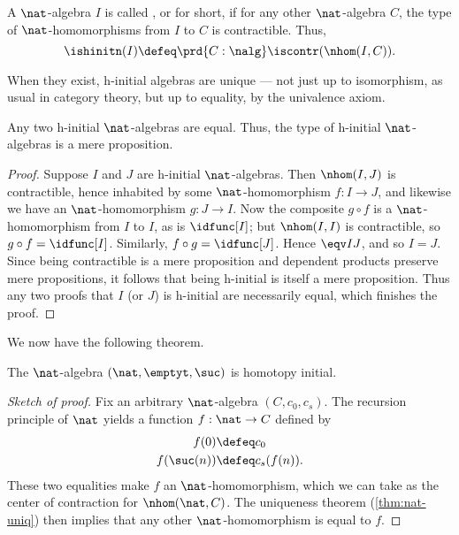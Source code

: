 \begin{defn}
  A $\nat$-algebra $I$ is called ,
  or 
  for short, if for any other $\nat$-algebra $C$, the type of $\nat$-homomorphisms from $I$ to $C$ is contractible. Thus,
\begin{equation*}
\ishinitn(I) \defeq \prd{C : \nalg} \iscontr(\nhom(I,C)).
\end{equation*}
\end{defn}

When they exist, h-initial algebras are unique --- not just up to isomorphism, as usual in category theory, but up to equality, by the univalence axiom.

\begin{thm}
  Any two h-initial $\nat$-algebras are equal.
  Thus, the type of h-initial $\nat$-algebras is a mere proposition.
\end{thm}
\begin{proof}
  Suppose $I$ and $J$ are h-initial $\nat$-algebras.
  Then $\nhom(I,J)$ is contractible, hence inhabited by some $\nat$-homomorphism $f:I\to J$, and likewise we have an $\nat$-homomorphism $g:J\to I$.
  Now the composite $g\circ f$ is a $\nat$-homomorphism from $I$ to $I$, as is $\idfunc[I]$; but $\nhom(I,I)$ is contractible, so $g\circ f = \idfunc[I]$.
  Similarly, $f\circ g = \idfunc[J]$.
  Hence $\eqv IJ$, and so $I=J$. Since being contractible is a mere proposition and dependent products preserve mere propositions, it follows that being h-initial is itself a mere proposition. Thus any two proofs that $I$ (or $J$) is h-initial are necessarily equal, which finishes the proof.
\end{proof}

We now have the following theorem.

\begin{thm}\label{thm:nat-hinitial}
The $\nat$-algebra $(\nat, \emptyt, \suc)$ is homotopy initial.
\end{thm}
\begin{proof}[Sketch of proof]
  Fix an arbitrary $\nat$-algebra $(C,c_0,c_s)$.
  The recursion principle of $\nat$ yields a function $f:\nat\to C$ defined by
  \begin{align*}
    f(0) &\defeq c_0\\
    f(\suc(n)) &\defeq c_s(f(n)).
  \end{align*}
  These two equalities make $f$ an $\nat$-homomorphism, which we can take as the center of contraction for $\nhom(\nat,C)$.
  The uniqueness theorem (\cref{thm:nat-uniq}) then implies that any other $\nat$-homomorphism is equal to $f$.
\end{proof}

